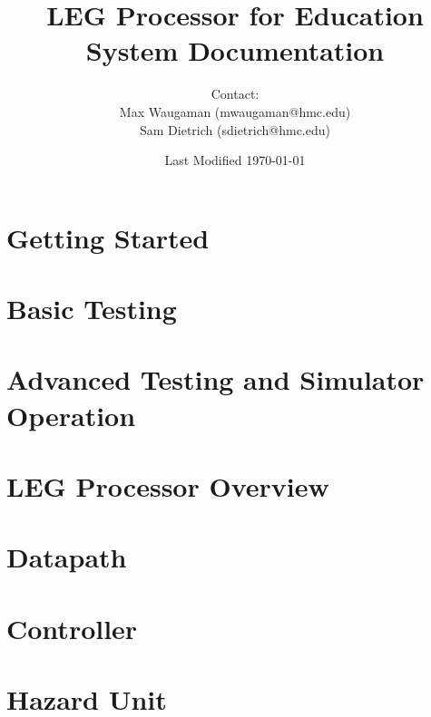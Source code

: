 \documentclass[12pt,letterpaper]{article}
\begin{document}
\title{LEG Processor for Education\\\Large{System Documentation}
}
\author{Contact: \\Max Waugaman (mwaugaman@hmc.edu) \\Sam Dietrich (sdietrich@hmc.edu)}
\date{Last Modified \today}
\maketitle
\thispagestyle{empty}
\pagebreak
\setcounter{page}{1}
\pagebreak

\tableofcontents
\pagebreak

\section{Getting Started}


\section{Basic Testing}

\pagebreak

\section{Advanced Testing and Simulator Operation}

\pagebreak

\section{LEG Processor Overview}


\section{Datapath}


\section{Controller}


\section{Hazard Unit}



\pagebreak


\pagebreak


\pagebreak
\end{document}
